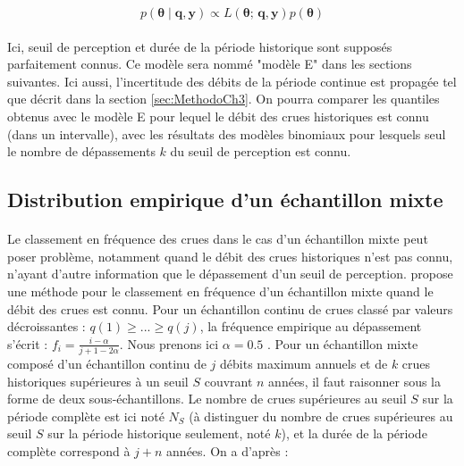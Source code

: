 		\begin{equation}
			p(\boldsymbol{\theta} \mid \boldsymbol{q},\boldsymbol{y}) \propto L(\boldsymbol{\theta};\,\boldsymbol{q},\boldsymbol{y})p(\boldsymbol{\theta})
		\label{eq:Bayes_Censure}
		\end{equation}

	\paragraph{} Ici, seuil de perception et durée de la période historique sont supposés parfaitement connus. Ce modèle sera nommé "modèle E" dans les sections suivantes. Ici aussi, l'incertitude des débits de la période continue est propagée tel que décrit dans la section \ref{sec:MethodoCh3}. On pourra comparer les quantiles obtenus avec le modèle E pour lequel le débit des crues historiques est connu (dans un intervalle), avec les résultats des modèles binomiaux pour lesquels seul le nombre de dépassements $k$ du seuil de perception est connu.
	

	\subsection{Distribution empirique d'un échantillon mixte}
	\label{subsec:DistEmpirique}
	
		\paragraph{} Le classement en fréquence des crues dans le cas d'un échantillon mixte peut poser problème, notamment quand le débit des crues historiques n'est pas connu, n'ayant d'autre information que le dépassement d'un seuil de perception. \citet{hirsch_probability_1987} propose une méthode pour le classement en fréquence d'un échantillon mixte quand le débit des crues est connu. Pour un échantillon continu de crues classé par valeurs décroissantes : $q(1) \geq ... \geq q(j)$, la fréquence empirique au dépassement s'écrit : $f_i = \frac{i-\alpha}{j+1-2\alpha}$. Nous prenons ici $\alpha = 0.5$ \citep{hazen_storage_1914}. Pour un échantillon mixte composé d'un échantillon continu de $j$ débits maximum annuels et de $k$ crues historiques supérieures à un seuil $S$ couvrant $n$ années, il faut raisonner sous la forme de deux sous-échantillons. Le nombre de crues supérieures au seuil $S$ sur la période complète est ici noté $N_S$ (à distinguer du nombre de crues supérieures au seuil $S$ sur la période historique seulement, noté $k$), et la durée de la période complète correspond à $j + n$ années. On a d'après \citet{hirsch_probability_1987} :
		
